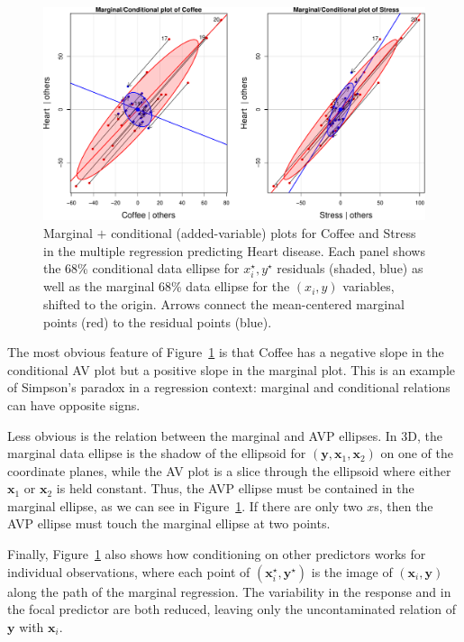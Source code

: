 \documentclass[
  letterpaper,
  10pt,
  krantz2]{krantz}
\begin{document}
{\begin{figure}[H]
{\includegraphics[width=1\textwidth,height=\textheight]{figs/ch06/fig-coffee-mcplot-1.pdf}

}

\caption{\label{fig-coffee-mcplot}Marginal \(+\) conditional
(added-variable) plots for Coffee and Stress in the multiple regression
predicting Heart disease. Each panel shows the 68\% conditional data
ellipse for \(x_i^\star, y^\star\) residuals (shaded, blue) as well as
the marginal 68\% data ellipse for the \((x_i, y)\) variables, shifted
to the origin. Arrows connect the mean-centered marginal points (red) to
the residual points (blue).}

\end{figure}%

The most obvious feature of Figure~\ref{fig-coffee-mcplot} is that
Coffee has a negative slope in the conditional AV plot but a positive
slope in the marginal plot. This is an example of Simpson's paradox in a
regression context: marginal and conditional relations can have opposite
signs. 

Less obvious is the relation between the marginal and AVP ellipses. In
3D, the marginal data ellipse is the shadow of the ellipsoid for
\((\mathbf{y}, \mathbf{x}_1, \mathbf{x}_2)\) on one of the coordinate
planes, while the AV plot is a slice through the ellipsoid where either
\(\mathbf{x}_1\) or \(\mathbf{x}_2\) is held constant. Thus, the AVP
ellipse must be contained in the marginal ellipse, as we can see in
Figure~\ref{fig-coffee-mcplot}. If there are only two \(x\)s, then the
AVP ellipse must touch the marginal ellipse at two points.

Finally, Figure~\ref{fig-coffee-mcplot} also shows how conditioning on
other predictors works for individual observations, where each point of
\((\mathbf{x}_i^\star, \mathbf{y}^\star)\) is the image of
\((\mathbf{x}_i, \mathbf{y})\) along the path of the marginal
regression. The variability in the response and in the focal predictor
are both reduced, leaving only the uncontaminated relation of
\(\mathbf{y}\) with \(\mathbf{x}_i\).

}
\end{document}
